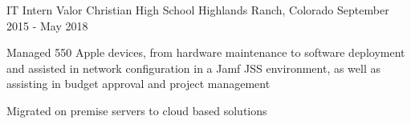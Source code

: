 \begin{cventries}
  \cventry
    {IT Intern}
    {Valor Christian High School }
    {Highlands Ranch, Colorado} %
    {September 2015 - May 2018} %
    {
      \begin{cvitems} %
        \item {Managed 550 Apple devices, from hardware maintenance
            to software deployment and assisted in network
            configuration in a Jamf JSS environment, as well as
            assisting in budget approval and project management}
        \item {Migrated on premise servers to cloud based solutions}
      \end{cvitems}
    }
    {}
    \fi
\end{cventries}
